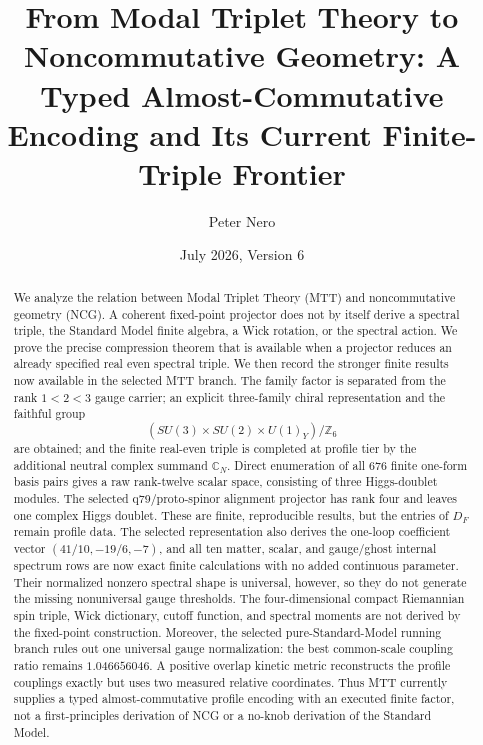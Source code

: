 \documentclass[11pt,a4paper,twoside]{article}
\title{\Large\bf From Modal Triplet Theory to Noncommutative Geometry:
A Typed Almost-Commutative Encoding and Its Current Finite-Triple Frontier}
\author{Peter Nero}
\date{July 2026, Version 6}
\theoremstyle{plain}
\theoremstyle{definition}
\theoremstyle{remark}
\newcommand{\DF}{D_{F}}
\newcommand{\CN}{\mathbb{C}_{N}}
\begin{document}
\maketitle

\begin{abstract}
We analyze the relation between Modal Triplet Theory (MTT) and
noncommutative geometry (NCG).  A coherent fixed-point projector does not by
itself derive a spectral triple, the Standard Model finite algebra, a Wick
rotation, or the spectral action.  We prove the precise compression theorem
that is available when a projector reduces an already specified real even
spectral triple.  We then record the stronger finite results now available in
the selected MTT branch.  The family factor is separated from the rank
$1<2<3$ gauge carrier; an explicit three-family chiral representation and the
faithful group
\[
  (SU(3)\times SU(2)\times U(1)_Y)/\mathbb{Z}_6
\]
are obtained; and the finite real-even triple is completed at profile tier by
the additional neutral complex summand $\CN$.  Direct enumeration of all
$676$ finite one-form basis pairs gives a raw rank-twelve scalar space,
consisting of three Higgs-doublet modules.  The selected q79/proto-spinor
alignment projector has rank four and leaves one complex Higgs doublet.  These
are finite, reproducible results, but the entries of $\DF$ remain profile
data.  The selected representation also derives the one-loop coefficient
vector $(41/10,-19/6,-7)$, and all ten matter, scalar, and gauge/ghost internal
spectrum rows are now exact finite calculations with no added continuous
parameter.  Their normalized nonzero spectral shape is universal, however,
so they do not generate the missing nonuniversal gauge thresholds.  The
four-dimensional compact Riemannian spin triple, Wick dictionary, cutoff
function, and spectral moments are not derived by the fixed-point
construction.  Moreover, the selected pure-Standard-Model running branch
rules out one universal gauge normalization: the best common-scale coupling
ratio remains $1.046656046$.  A positive overlap kinetic metric reconstructs
the profile couplings exactly but uses two measured relative coordinates.
Thus MTT currently supplies a typed almost-commutative profile encoding with
an executed finite factor, not a first-principles derivation of NCG or a
no-knob derivation of the Standard Model.
\end{abstract}
\end{document}
